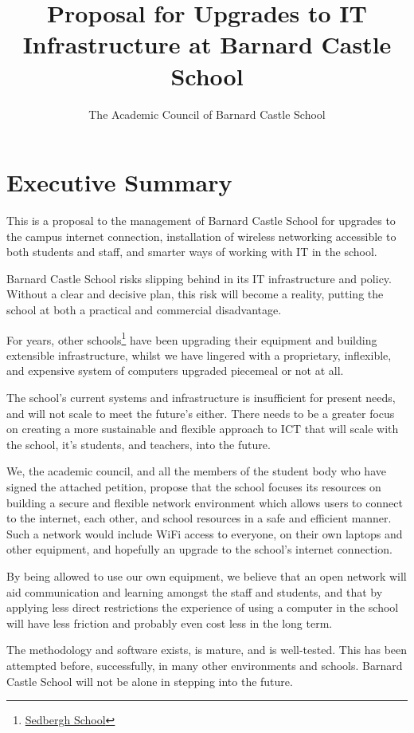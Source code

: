 \documentclass[a4paper,leqno,titlepage]{article}
\title{Proposal for Upgrades to IT Infrastructure at Barnard Castle School}
\author{The Academic Council of Barnard Castle School}
\begin{document}
\maketitle

\section{Executive Summary}

This is a proposal to the management of Barnard Castle School for upgrades
to the campus internet connection,
installation of wireless networking accessible to both students and staff,
and smarter ways of working with IT in the school. 

Barnard Castle School risks slipping behind in its
IT infrastructure and policy.
Without a clear and decisive plan, this risk will become a reality, putting
the school at both a practical and commercial disadvantage.


For years, other schools\footnote{\href{http://www.sedberghschool.org/ict.html}{Sedbergh School}} 
have been upgrading their equipment and building extensible infrastructure,
whilst we have lingered with a proprietary, inflexible, and expensive system of
computers upgraded piecemeal or not at all.


The school's current systems and infrastructure is insufficient for present
needs, and will not scale to meet the future's either.
There needs to be a greater focus on creating a more sustainable and flexible
approach to ICT that will scale with the school, it's students, and teachers,
into the future.


We, the academic council, and all the members of the student body who have signed
the attached petition, propose that the school focuses its resources on building
a secure and flexible network environment which allows users to connect to the
internet, each other, and school resources in a safe and efficient manner.
Such a network would include WiFi access to everyone, on their own laptops and
other equipment, and hopefully an upgrade to the school's internet connection.


By being allowed to use our own equipment, we believe that an open network will
aid communication and learning amongst the staff and students, and that by
applying less direct restrictions the experience of using a computer in the
school will have less friction and probably even cost less in the long term.


The methodology and software exists, is mature, and is well-tested. This has
been attempted before, successfully, in many other environments and schools.
Barnard Castle School will not be alone in stepping into the future.
\end{document}
